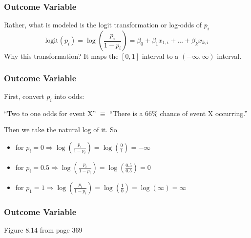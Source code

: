 \documentclass[handout]{beamer}
\newcommand{\blue}[1]{\textcolor{blue2}{#1}}
\begin{document}
\begin{frame}[fragile]
\frametitle{Outcome Variable}

%
%
Rather, what is modeled is the \blue{logit transformation} or \blue{log-odds} of $p_i$
\[
\mbox{logit}(p_i) = \log\left(
\frac{p_i}{1-p_i}
\right) = \beta_0 + \beta_1 x_{1,i} + \ldots + \beta_k x_{k,i}
\]
\pause
Why this transformation?  It maps the $[0,1]$ interval to a $(-\infty, \infty)$ interval.  
\end{frame}


\begin{frame}[fragile]
\frametitle{Outcome Variable}

%
%
First, convert $p_i$ into odds:

\vspace{0.25cm}

``Two to one odds for event X'' $\equiv$ ``There is a 66\% chance of event X occurring.''

\pause \vspace{0.25cm}


Then we take the natural log of it.  So
\begin{itemize}
\pause\item for $p_i=0 \Rightarrow \log\left(\frac{p_i}{1-p_i}\right) = \log\left(\frac{0}{1}\right) = -\infty$
\pause\item for $p_i=0.5 \Rightarrow \log\left(\frac{p_i}{1-p_i}\right) = \log\left(\frac{0.5}{0.5}\right) = 0$
\pause\item for $p_1=1  \Rightarrow \log\left(\frac{p_i}{1-p_i}\right) = \log\left(\frac{1}{0}\right) = \log(\infty) = \infty$
\end{itemize}

\end{frame}


\begin{frame}[fragile]
\frametitle{Outcome Variable}
Figure 8.14 from page 369

\vspace{6cm}

\end{frame}
\end{document}
